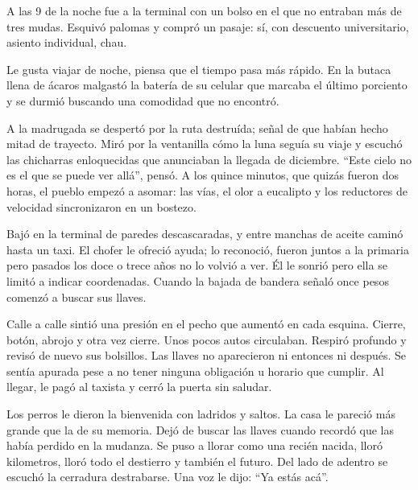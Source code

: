 
A las 9 de la noche fue a la terminal con un bolso en el que no entraban
más de tres mudas. Esquivó palomas y compró un pasaje: sí, con 
descuento universitario, asiento individual, chau.

Le gusta viajar de noche, piensa que el tiempo pasa más rápido. En la
butaca llena de ácaros malgastó la batería de su celular que marcaba
el último porciento y se durmió buscando una comodidad que no encontró.

A la madrugada se despertó por la ruta destruída; señal de que habían
hecho mitad de trayecto. Miró por la ventanilla cómo la luna seguía su
viaje y escuchó las chicharras enloquecidas que anunciaban la llegada
de diciembre. ``Este cielo no es el que se puede ver allá'', pensó. A los
quince minutos, que quizás fueron dos horas, el pueblo empezó a asomar:
las vías, el olor a eucalipto y los reductores de velocidad sincronizaron
en un bostezo.

Bajó en la terminal de paredes descascaradas, y entre manchas de aceite
caminó hasta un taxi. El chofer le ofreció ayuda; lo reconoció, fueron
juntos a la primaria pero pasados los doce o trece años no lo volvió a
ver. Él le sonrió pero ella se limitó a indicar coordenadas. Cuando la
bajada de bandera señaló once pesos comenzó a buscar sus llaves. 

Calle a calle sintió una presión en el pecho que aumentó en cada esquina.
Cierre, botón, abrojo y otra vez cierre. Unos pocos autos circulaban.
Respiró profundo y revisó de nuevo sus bolsillos. Las llaves no aparecieron
ni entonces ni después. Se sentía apurada pese a no tener ninguna obligación
u horario que cumplir. Al llegar, le pagó al taxista y cerró la puerta sin
saludar.

Los perros le dieron la bienvenida con ladridos y saltos. La casa le
pareció más grande que la de su memoria. Dejó de buscar las llaves cuando
recordó que las había perdido en la mudanza. Se puso a llorar como una
recién nacida, lloró kilometros, lloró todo el destierro y también el
futuro. Del lado de adentro se escuchó la cerradura destrabarse. Una voz
le dijo: ``Ya estás acá''.
